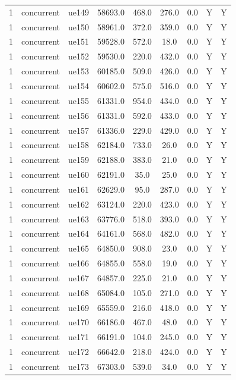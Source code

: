 \begin{table}[ht]
\begin{tabular}{|c|c|c|c|c|c|c|c|c|}
1 & concurrent & ue149 & 58693.0 & 468.0 & 276.0 & 0.0 & Y & Y \\
1 & concurrent & ue150 & 58961.0 & 372.0 & 359.0 & 0.0 & Y & Y \\
1 & concurrent & ue151 & 59528.0 & 572.0 & 18.0 & 0.0 & Y & Y \\
1 & concurrent & ue152 & 59530.0 & 220.0 & 432.0 & 0.0 & Y & Y \\
1 & concurrent & ue153 & 60185.0 & 509.0 & 426.0 & 0.0 & Y & Y \\
1 & concurrent & ue154 & 60602.0 & 575.0 & 516.0 & 0.0 & Y & Y \\
1 & concurrent & ue155 & 61331.0 & 954.0 & 434.0 & 0.0 & Y & Y \\
1 & concurrent & ue156 & 61331.0 & 592.0 & 433.0 & 0.0 & Y & Y \\
1 & concurrent & ue157 & 61336.0 & 229.0 & 429.0 & 0.0 & Y & Y \\
1 & concurrent & ue158 & 62184.0 & 733.0 & 26.0 & 0.0 & Y & Y \\
1 & concurrent & ue159 & 62188.0 & 383.0 & 21.0 & 0.0 & Y & Y \\
1 & concurrent & ue160 & 62191.0 & 35.0 & 25.0 & 0.0 & Y & Y \\
1 & concurrent & ue161 & 62629.0 & 95.0 & 287.0 & 0.0 & Y & Y \\
1 & concurrent & ue162 & 63124.0 & 220.0 & 423.0 & 0.0 & Y & Y \\
1 & concurrent & ue163 & 63776.0 & 518.0 & 393.0 & 0.0 & Y & Y \\
1 & concurrent & ue164 & 64161.0 & 568.0 & 482.0 & 0.0 & Y & Y \\
1 & concurrent & ue165 & 64850.0 & 908.0 & 23.0 & 0.0 & Y & Y \\
1 & concurrent & ue166 & 64855.0 & 558.0 & 19.0 & 0.0 & Y & Y \\
1 & concurrent & ue167 & 64857.0 & 225.0 & 21.0 & 0.0 & Y & Y \\
1 & concurrent & ue168 & 65084.0 & 105.0 & 271.0 & 0.0 & Y & Y \\
1 & concurrent & ue169 & 65559.0 & 216.0 & 418.0 & 0.0 & Y & Y \\
1 & concurrent & ue170 & 66186.0 & 467.0 & 48.0 & 0.0 & Y & Y \\
1 & concurrent & ue171 & 66191.0 & 104.0 & 245.0 & 0.0 & Y & Y \\
1 & concurrent & ue172 & 66642.0 & 218.0 & 424.0 & 0.0 & Y & Y \\
1 & concurrent & ue173 & 67303.0 & 539.0 & 34.0 & 0.0 & Y & Y \\

\end{tabular}
\end{table}
